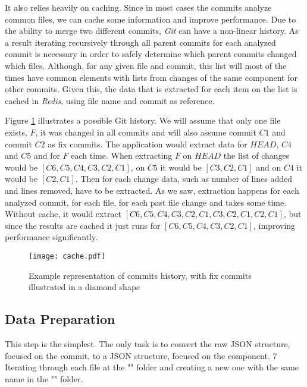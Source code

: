It also relies heavily on caching. Since in most cases the commits analyze common files, we can cache some information and improve performance.
Due to the ability to merge two different commits, \emph{Git} can have a non-linear history.
As a result iterating recursively through all parent commits for each analyzed commit is necessary in order to safely determine which parent commits changed which files.
Although, for any given file and commit, this list will most of the times have common elements with lists from changes of the same component for other commits.
Given this, the data that is extracted for each item on the list is cached in \emph{Redis}, using file name and commit as reference.

Figure \ref{fig:cache} illustrates a possible Git history. We will assume that only one file exists, $F$, it was changed in all commits and will also assume commit $C1$ and commit $C2$ as fix commits.
The application would extract data for $HEAD$, $C4$ and $C5$ and for $F$ each time. When extracting $F$ on $HEAD$ the list of changes would be $[C6, C5, C4, C3, C2, C1]$, on $C5$ it would be $[C3, C2, C1]$ and on $C4$ it would be $[C2, C1]$.
Then for each change data, such as number of lines added and lines removed, have to be extracted.
As we saw, extraction happens for each analyzed commit, for each file, for each past file change and takes some time.
Without cache, it would extract $[C6, C5, C4, C3, C2, C1, C3, C2, C1, C2, C1]$, but since the results are cached it just runs for $[C6, C5, C4, C3, C2, C1]$, improving performance significantly.
%
\begin{figure}[ht]
  \begin{center}
    \leavevmode
    \texttt{[image: cache.pdf]}
    \caption{Example representation of commits history, with fix commits illustrated in a diamond shape}
    \label{fig:cache}
  \end{center}
\end{figure}


\subsection{Data Preparation}

This step is the simplest. The only task is to convert the raw JSON structure, focused on the commit, to a JSON structure, focused on the component. 7
Iterating through each file at the "" folder and creating a new one with the same name in the "" folder.

